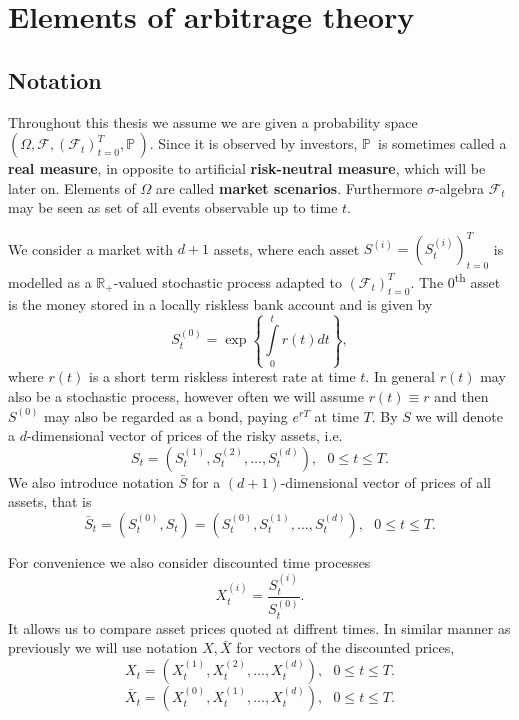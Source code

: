 \documentclass[a4paper,12pt, oneside]{book}
\theoremstyle{definition}
\theoremstyle{remark}
\def\P{{\mathbb{P}}\,}
\def\R{{\mathbb{R}}}
\def\Sa{\bar{S}}
\def\Xa{\bar{X}}
\begin{document}
\section{Elements of arbitrage theory}

\subsection{Notation}
Throughout this thesis we assume we are given a probability space $(\Omega, \mathcal{F}, (\mathcal{F}_t)_{t=0}^T, \P)$. Since it is observed by investors, $\P$ is sometimes called a \textbf{real measure}, in opposite to artificial \textbf{risk-neutral measure}, which will be later on. Elements of $\Omega$ are called \textbf{market scenarios}.
Furthermore $\sigma$-algebra $\mathcal{F}_t$ may be seen as set of all events observable up to time $t$.

We consider a market with $d+1$ assets, where each asset $S^{(i)} = (S^{(i)}_t)_{t=0}^T$ is modelled as a $\R_+$-valued stochastic process adapted to $(\mathcal{F}_t)_{t=0}^T$. The $0$\textsuperscript{th} asset is the money stored in a locally riskless bank account and is given by 
\[S^{(0)}_t = \exp\left\{ \int\limits_0^t r(t)dt \right\},\]
where $r(t)$ is a short term riskless interest rate at time $t$. In general $r(t)$ may also be a stochastic process, however often we will assume $r(t) \equiv r$ and then $S^{(0)}$ may also be regarded as a bond, paying $e^{rT}$ at time $T$. By $S$ we will denote a $d$-dimensional vector of prices of the risky assets, i.e.
\begin{equation*}
 S_t = (S^{(1)}_t, S^{(2)}_t, \ldots, S^{(d)}_t), \ \ \ 0 \leq t \leq T.
\end{equation*}
We also introduce notation $\Sa$ for a $(d+1)$-dimensional vector of prices of all assets, that is
\begin{equation*}
 \Sa_t = (S^{(0)}_t, S_t) = (S^{(0)}_t, S^{(1)}_t, \ldots, S^{(d)}_t), \ \ \ 0 \leq t \leq T.
\end{equation*}

For convenience we also consider discounted time processes
\[ X^{(i)}_t = \frac{S^{(i)}_t}{S^{(0)}_t}. \]
It allows us to compare asset prices quoted at diffrent times. In similar manner as previously we will use notation $X, \Xa$ for vectors of the discounted prices,
\begin{equation*}
 X_t = (X^{(1)}_t, X^{(2)}_t, \ldots, X^{(d)}_t), \ \ \ 0 \leq t \leq T.
\end{equation*}
\begin{equation*}
 \Xa_t = (X^{(0)}_t, X^{(1)}_t, \ldots, X^{(d)}_t), \ \ \ 0 \leq t \leq T.
\end{equation*}
\end{document}
